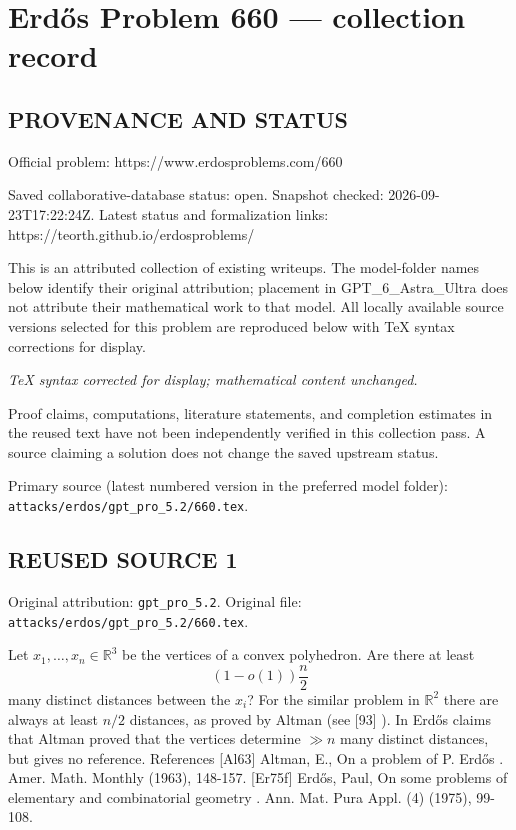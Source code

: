 \section*{Erd\H{o}s Problem 660 --- collection record}

\subsection*{PROVENANCE AND STATUS}
Official problem: https://www.erdosproblems.com/660

Saved collaborative-database status: open.
Snapshot checked: 2026-09-23T17:22:24Z.
Latest status and formalization links: https://teorth.github.io/erdosproblems/

This is an attributed collection of existing writeups. The model-folder names below identify their original attribution; placement in GPT\_6\_Astra\_Ultra does not attribute their mathematical work to that model. All locally available source versions selected for this problem are reproduced below with TeX syntax corrections for display.

\emph{TeX syntax corrected for display; mathematical content unchanged.}

Proof claims, computations, literature statements, and completion estimates in the reused text have not been independently verified in this collection pass. A source claiming a solution does not change the saved upstream status.

Primary source (latest numbered version in the preferred model folder): \texttt{attacks/erdos/gpt\_pro\_5.2/660.tex}.

\subsection*{REUSED SOURCE 1}
Original attribution: \texttt{gpt\_pro\_5.2}.
Original file: \texttt{attacks/erdos/gpt\_pro\_5.2/660.tex}.


Let $x_1,\ldots,x_n\in \mathbb{R}^3$ be the vertices of a convex polyhedron. Are there at least\[(1-o(1))\frac{n}{2}\]many distinct distances between the $x_i$? For the similar problem in $\mathbb{R}^2$ there are always at least $n/2$ distances, as proved by Altman \cite{Al63} (see [93] ). In \cite{Er75f} Erd\H{o}s claims that Altman proved that the vertices determine $\gg n$ many distinct distances, but gives no reference. References [Al63] Altman, E., On a problem of P. Erd\H{o}s . Amer. Math. Monthly (1963), 148-157. [Er75f] Erd\H{o}s, Paul, On some problems of elementary and combinatorial geometry . Ann. Mat. Pura Appl. (4) (1975), 99-108.


